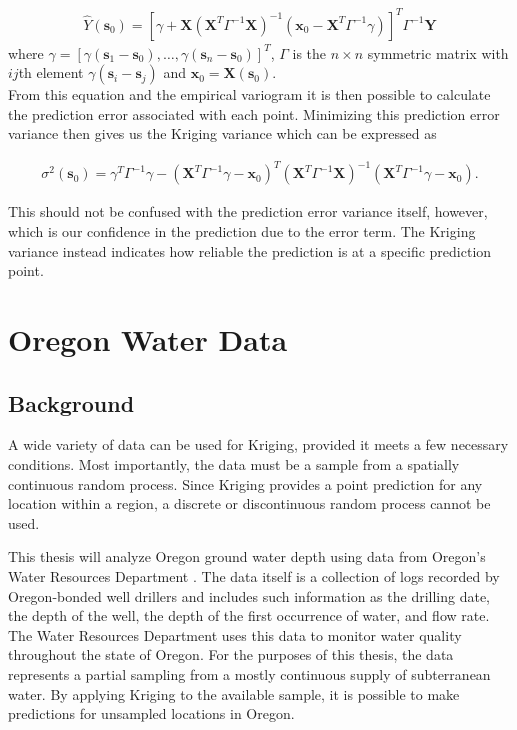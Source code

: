 \documentclass[12pt,twoside]{reedthesis}
\begin{document}
\begin{align*}
\hat Y(\mathbf{s}_0) = [\gamma + \mathbf{X}(\mathbf{X}^T\Gamma^{-1}\mathbf{X})^{-1}(\mathbf{x}_0 - \mathbf{X}^T\Gamma^{-1}\gamma)]^T\Gamma^{-1}\mathbf{Y}
\end{align*}
where $\gamma = [\gamma(\mathbf{s}_1 - \mathbf{s}_0), \dots, \gamma(\mathbf{s}_n - \mathbf{s}_0)]^T$, $\Gamma$ is the $n \times n$ symmetric matrix with $ij$th element $\gamma(\mathbf{s}_i - \mathbf{s}_j)$ and $\mathbf{x}_0 = \mathbf{X}(\mathbf{s}_0)$. \\

From this equation and the empirical variogram it is then possible to calculate the prediction error associated with each point. Minimizing this prediction error variance then gives us the Kriging variance which can be expressed as

\begin{align*}
\sigma^2(\mathbf{s}_0) = \gamma^T\Gamma^{-1}\gamma - (\mathbf{X}^T\Gamma^{-1}\gamma - \mathbf{x}_0)^T(\mathbf{X}^T\Gamma^{-1}\mathbf{X})^{-1}(\mathbf{X}^T\Gamma^{-1}\gamma - \mathbf{x}_0).
\end{align*}

This should not be confused with the prediction error variance itself, however, which is our confidence in the prediction due to the error term. The Kriging variance instead indicates how reliable the prediction is at a specific prediction point.



\chapter{Oregon Water Data}

\section{Background}
A wide variety of data can be used for Kriging, provided it meets a few necessary conditions. Most importantly, the data must be a sample from a spatially continuous random process. Since Kriging provides a point prediction for any location within a region, a discrete or discontinuous random process cannot be used. 

This thesis will analyze Oregon ground water depth using data from Oregon's Water Resources Department \cite{groundwater}. The data itself is a collection of logs recorded by Oregon-bonded well drillers and includes such information as the drilling date, the depth of the well, the depth of the first occurrence of water, and flow rate. The Water Resources Department uses this data to monitor water quality throughout the state of Oregon. For the purposes of this thesis, the data represents a partial sampling from a mostly continuous supply of subterranean water. By applying Kriging to the available sample, it is possible to make predictions for unsampled locations in Oregon. 
\end{document}
